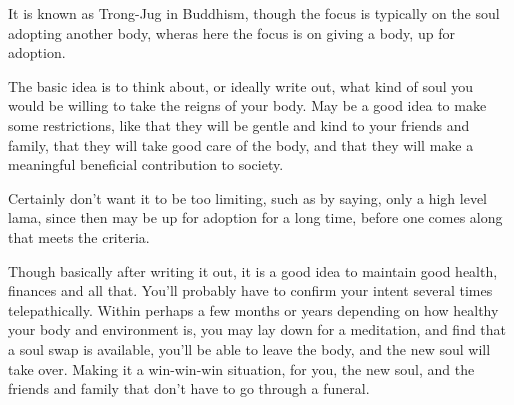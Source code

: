 It is known as Trong-Jug in Buddhism, though the focus is typically on the soul 
adopting another body, wheras here the focus is on giving a body, up for 
adoption.  

The basic idea is to think about, or ideally write out, what kind of soul you
would be willing to take the reigns of your body. May be a good idea to make
some restrictions, like that they will be gentle and kind to your friends and
family, that they will take good care of the body, and that they will make a
meaningful beneficial contribution to society. 

Certainly don't want it to be too limiting, such as by saying, only a high level
lama, since then may be up for adoption for a long time, before one comes along
that meets the criteria. 

Though basically after writing it out, it is a good idea to maintain good
health, finances and all that. You'll probably have to confirm your intent
several times telepathically. Within perhaps a few months or years depending on
how healthy your body and environment is, you may lay down for a meditation, and
find that a soul swap is available, you'll be able to leave the body, and the
new soul will take over. Making it a win-win-win situation, for you, the new
soul, and the friends and family that don't have to go through a funeral. 



